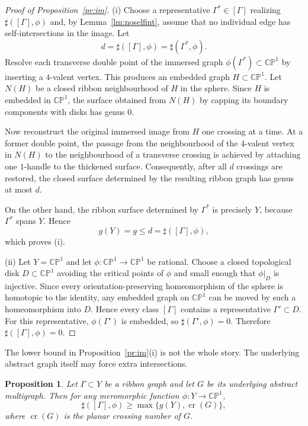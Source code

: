 \documentclass[reqno]{amsart}
\newtheorem{proposition}[theorem]{Proposition}
\theoremstyle{definition}
\newcommand {\Ga}{\Gamma}
\newcommand {\bCP} {\mathbb {CP}}
\newcommand \crs {\operatorname{cr}}
\begin{document}
\begin{proof}[Proof of Proposition~\ref{pr:im}]
(i) Choose a representative $\Ga^*\in[\Ga]$ realizing $\sharp([\Ga],\phi)$ and, by Lemma~\ref{lm:noselfint}, assume that no individual edge has self-intersections in the image. Let
\[
d=\sharp([\Ga],\phi)=\sharp(\Ga^*,\phi).
\]
Resolve each transverse double point of the immersed graph $\phi(\Ga^*)\subset \bCP^1$ by inserting a $4$-valent vertex. This produces an embedded graph $H\subset \bCP^1$. Let $N(H)$ be a closed ribbon neighbourhood of $H$ in the sphere. Since $H$ is embedded in $\bCP^1$, the surface obtained from $N(H)$ by capping its boundary components with disks has genus $0$.

Now reconstruct the original immersed image from $H$ one crossing at a time. At a former double point, the passage from the neighbourhood of the $4$-valent vertex in $N(H)$ to the neighbourhood of a transverse crossing is achieved by attaching one $1$-handle to the thickened surface. Consequently, after all $d$ crossings are restored, the closed surface determined by the resulting ribbon graph has genus at most $d$.

On the other hand, the ribbon surface determined by $\Ga^*$ is precisely $Y$, because $\Ga^*$ spans $Y$. Hence
\[
g(Y)=g\le d=\sharp([\Ga],\phi),
\]
which proves (i).

(ii) Let $Y=\bCP^1$ and let $\phi:\bCP^1\to \bCP^1$ be rational. Choose a closed topological disk $D\subset \bCP^1$ avoiding the critical points of $\phi$ and small enough that $\phi|_D$ is injective. Since every orientation-preserving homeomorphism of the sphere is homotopic to the identity, any embedded graph on $\bCP^1$ can be moved by such a homeomorphism into $D$. Hence every class $[\Ga]$ contains a representative $\Ga'\subset D$. For this representative, $\phi(\Ga')$ is embedded, so $\sharp(\Ga',\phi)=0$. Therefore $\sharp([\Ga],\phi)=0$.
\end{proof}

The lower bound in Proposition~\ref{pr:im}(i) is not the whole story. The underlying abstract graph itself may force extra intersections.

\begin{proposition}\label{pr:crossing}
Let $\Ga\subset Y$ be a ribbon graph and let $G$ be its underlying abstract multigraph. Then for any meromorphic function $\phi:Y\to \bCP^1$,
\[
\sharp([\Ga],\phi)\ge \max\{g(Y),\crs(G)\},
\]
where $\crs(G)$ is the planar crossing number of $G$.
\end{proposition}
\end{document}
